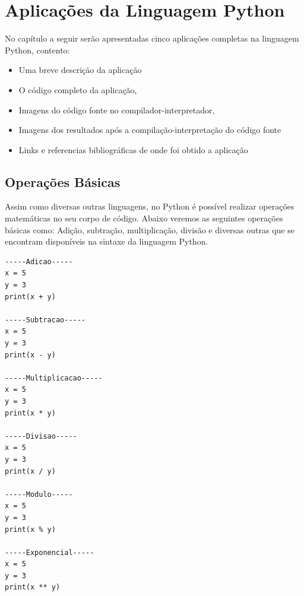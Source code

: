 


\chapter{ Aplica\c{c}\~{o}es da Linguagem Python}

No capítulo a seguir serão apresentadas cinco aplica\c{c}\~{o}es completas na linguagem Python, contento:
\begin{itemize}
  \item Uma breve descri\c{c}\~{a}o da aplica\c{c}\~{a}o
  \item O c\'{o}digo completo da aplica\c{c}\~{a}o,
  \item Imagens do c\'{o}digo fonte no compilador-interpretador,
  \item Imagens dos resultados ap\'{o}s a compila\c{c}\~{a}o-interpreta\c{c}\~{a}o do c\'{o}digo fonte
  \item Links e referencias bibliogr\'{a}ficas de onde foi obtido a aplica\c{c}\~{a}o
\end{itemize}




    \section{Opera\c{c}\~{o}es Básicas}

Assim como diversas outras linguagens, no Python é possível realizar operações matemáticas no seu corpo de código. Abaixo veremos as seguintes operações básicas como: Adição, subtração, multiplicação, divisão e diversas outras que se encontram disponíveis na sintaxe da linguagem Python.

\begin{lstlisting}
-----Adicao-----	
x = 5
y = 3
print(x + y)

-----Subtracao-----
x = 5
y = 3
print(x - y)	
	
-----Multiplicacao-----
x = 5
y = 3
print(x * y)

-----Divisao-----
x = 5
y = 3
print(x / y)

-----Modulo-----
x = 5
y = 3
print(x % y)

-----Exponencial-----
x = 5
y = 3
print(x ** y)
\end{lstlisting}

